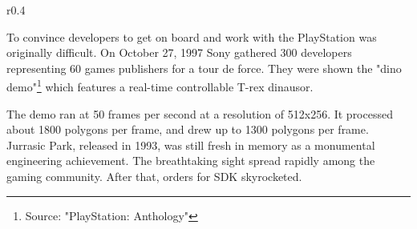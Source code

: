 \par
\begin{wrapfigure}[10]{r}{0.4\textwidth}{
\centering {}}
\end{wrapfigure}
To convince developers to get on board and work with the PlayStation was originally difficult. On October 27, 1997 Sony gathered 300 developers representing 60 games publishers for a tour de force. They were shown the "dino demo"\footnote{Source: "PlayStation: Anthology"} which features a real-time controllable T-rex dinausor.\\
\par The demo ran at 50 frames per second at a resolution of 512x256. It processed about 1800 polygons per frame, and drew up to 1300 polygons per frame. Jurrasic Park, released in 1993, was still fresh in memory as a monumental engineering achievement. The breathtaking sight spread rapidly among the gaming community. After that, orders for SDK skyrocketed.
 
 







